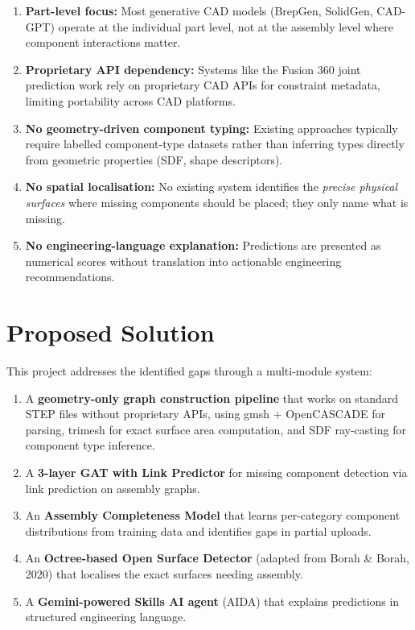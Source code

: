 \documentclass[12pt]{report}
\begin{document}
\begin{enumerate}[label=\arabic*.]
    \item \textbf{Part-level focus:} Most generative CAD models (BrepGen, SolidGen, CAD-GPT) operate at the individual part level, not at the assembly level where component interactions matter.
    \item \textbf{Proprietary API dependency:} Systems like the Fusion 360 joint prediction work rely on proprietary CAD APIs for constraint metadata, limiting portability across CAD platforms.
    \item \textbf{No geometry-driven component typing:} Existing approaches typically require labelled component-type datasets rather than inferring types directly from geometric properties (SDF, shape descriptors).
    \item \textbf{No spatial localisation:} No existing system identifies the \textit{precise physical surfaces} where missing components should be placed; they only name what is missing.
    \item \textbf{No engineering-language explanation:} Predictions are presented as numerical scores without translation into actionable engineering recommendations.
\end{enumerate}

\section{Proposed Solution}

This project addresses the identified gaps through a multi-module system:

\begin{enumerate}[label=\arabic*.]
    \item A \textbf{geometry-only graph construction pipeline} that works on standard STEP files without proprietary APIs, using gmsh + OpenCASCADE for parsing, trimesh for exact surface area computation, and SDF ray-casting for component type inference.
    \item A \textbf{3-layer GAT with Link Predictor} for missing component detection via link prediction on assembly graphs.
    \item An \textbf{Assembly Completeness Model} that learns per-category component distributions from training data and identifies gaps in partial uploads.
    \item An \textbf{Octree-based Open Surface Detector} (adapted from Borah \& Borah, 2020) that localises the exact surfaces needing assembly.
    \item A \textbf{Gemini-powered Skills AI agent} (AIDA) that explains predictions in structured engineering language.
\end{enumerate}
\end{document}
